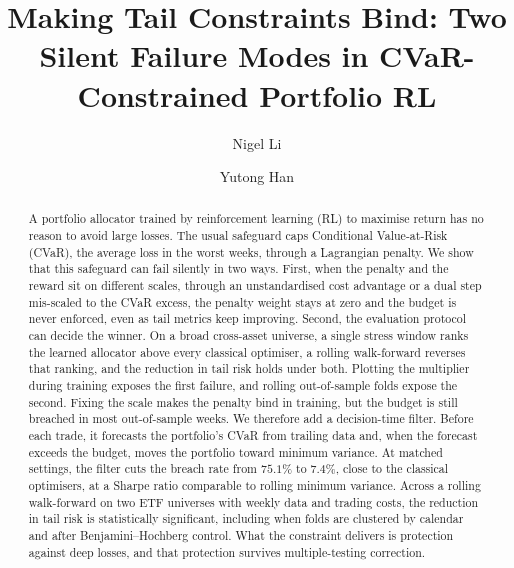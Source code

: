\documentclass[sigconf]{acmart}
\begin{document}

\title{Making Tail Constraints Bind: Two Silent Failure Modes in
CVaR-Constrained Portfolio RL}

\author{Nigel Li}

\author{Yutong Han}

\begin{abstract}
A portfolio allocator trained by reinforcement learning (RL) to maximise return has no reason
to avoid large losses. The usual safeguard caps Conditional Value-at-Risk (CVaR), the average
loss in the worst weeks, through a Lagrangian penalty. We show that this safeguard can fail
silently in two ways. First, when the penalty and the reward sit on different scales, through
an unstandardised cost advantage or a dual step mis-scaled to the CVaR excess, the penalty
weight stays at zero and the budget is never enforced, even as tail metrics keep improving.
Second, the evaluation protocol can decide the winner. On a broad cross-asset universe, a single stress window ranks the learned allocator above every classical optimiser, a rolling
walk-forward reverses that ranking, and the reduction in tail risk holds under both. Plotting the multiplier during training exposes
the first failure, and rolling out-of-sample folds expose the second. Fixing
the scale makes the penalty bind in training, but the budget is still breached in most
out-of-sample weeks. We therefore add a decision-time filter. Before each trade, it forecasts
the portfolio's CVaR from trailing data and, when the forecast exceeds the budget, moves the
portfolio toward minimum variance. At matched settings, the filter cuts the breach rate from
$75.1\%$ to $7.4\%$, close to the classical optimisers, at a Sharpe ratio comparable to rolling
minimum variance. Across a rolling walk-forward on two ETF universes with weekly data and
trading costs, the reduction in tail risk is statistically significant, including when folds
are clustered by calendar and after Benjamini--Hochberg control. What the constraint delivers
is protection against deep losses, and that protection survives multiple-testing correction.
\end{abstract}
\end{document}
